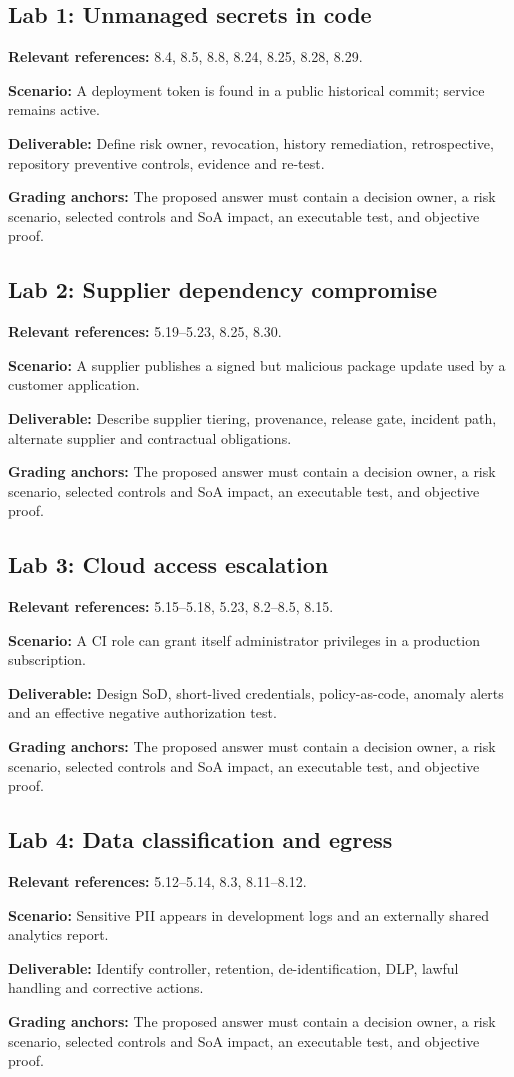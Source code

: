 \documentclass[11pt,letterpaper]{article}
\begin{document}
\subsection{Lab 1: Unmanaged secrets in code}
\textbf{Relevant references:} 8.4, 8.5, 8.8, 8.24, 8.25, 8.28, 8.29.\par\textbf{Scenario:} A deployment token is found in a public historical commit; service remains active.\par\textbf{Deliverable:} Define risk owner, revocation, history remediation, retrospective, repository preventive controls, evidence and re-test.\par\textbf{Grading anchors:} The proposed answer must contain a decision owner, a risk scenario, selected controls and SoA impact, an executable test, and objective proof.\par
\subsection{Lab 2: Supplier dependency compromise}
\textbf{Relevant references:} 5.19--5.23, 8.25, 8.30.\par\textbf{Scenario:} A supplier publishes a signed but malicious package update used by a customer application.\par\textbf{Deliverable:} Describe supplier tiering, provenance, release gate, incident path, alternate supplier and contractual obligations.\par\textbf{Grading anchors:} The proposed answer must contain a decision owner, a risk scenario, selected controls and SoA impact, an executable test, and objective proof.\par
\subsection{Lab 3: Cloud access escalation}
\textbf{Relevant references:} 5.15--5.18, 5.23, 8.2--8.5, 8.15.\par\textbf{Scenario:} A CI role can grant itself administrator privileges in a production subscription.\par\textbf{Deliverable:} Design SoD, short-lived credentials, policy-as-code, anomaly alerts and an effective negative authorization test.\par\textbf{Grading anchors:} The proposed answer must contain a decision owner, a risk scenario, selected controls and SoA impact, an executable test, and objective proof.\par
\subsection{Lab 4: Data classification and egress}
\textbf{Relevant references:} 5.12--5.14, 8.3, 8.11--8.12.\par\textbf{Scenario:} Sensitive PII appears in development logs and an externally shared analytics report.\par\textbf{Deliverable:} Identify controller, retention, de-identification, DLP, lawful handling and corrective actions.\par\textbf{Grading anchors:} The proposed answer must contain a decision owner, a risk scenario, selected controls and SoA impact, an executable test, and objective proof.\par
\end{document}
